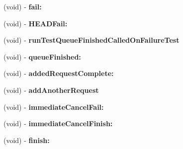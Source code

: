 \begin{DoxyCompactItemize}
\item 
\hypertarget{interface_a_s_i_network_queue_tests_07_08_a672f203e09f2d4f39fb2f1824cd85443}{
(void) -\/ {\bfseries fail\-:}}
\label{interface_a_s_i_network_queue_tests_07_08_a672f203e09f2d4f39fb2f1824cd85443}

\item 
\hypertarget{interface_a_s_i_network_queue_tests_07_08_abebd73c6087a317cf7d40a0694fa0554}{
(void) -\/ {\bfseries \-H\-E\-A\-D\-Fail\-:}}
\label{interface_a_s_i_network_queue_tests_07_08_abebd73c6087a317cf7d40a0694fa0554}

\item 
\hypertarget{interface_a_s_i_network_queue_tests_07_08_a863286b45c212a9aff1fd8c9415e8eb8}{
(void) -\/ {\bfseries run\-Test\-Queue\-Finished\-Called\-On\-Failure\-Test}}
\label{interface_a_s_i_network_queue_tests_07_08_a863286b45c212a9aff1fd8c9415e8eb8}

\item 
\hypertarget{interface_a_s_i_network_queue_tests_07_08_a7d969cf7beaae41da4ec7ee5d2f524d4}{
(void) -\/ {\bfseries queue\-Finished\-:}}
\label{interface_a_s_i_network_queue_tests_07_08_a7d969cf7beaae41da4ec7ee5d2f524d4}

\item 
\hypertarget{interface_a_s_i_network_queue_tests_07_08_ab8add5e0479640989a141e56dfcf046a}{
(void) -\/ {\bfseries added\-Request\-Complete\-:}}
\label{interface_a_s_i_network_queue_tests_07_08_ab8add5e0479640989a141e56dfcf046a}

\item 
\hypertarget{interface_a_s_i_network_queue_tests_07_08_a7f9925729daa7cce26bd2301d1b86c2b}{
(void) -\/ {\bfseries add\-Another\-Request}}
\label{interface_a_s_i_network_queue_tests_07_08_a7f9925729daa7cce26bd2301d1b86c2b}

\item 
\hypertarget{interface_a_s_i_network_queue_tests_07_08_ab7c057d1956cb3bda4f21d43260ee1a7}{
(void) -\/ {\bfseries immediate\-Cancel\-Fail\-:}}
\label{interface_a_s_i_network_queue_tests_07_08_ab7c057d1956cb3bda4f21d43260ee1a7}

\item 
\hypertarget{interface_a_s_i_network_queue_tests_07_08_a7d6d1e74ed81581f13c7fa469a78154d}{
(void) -\/ {\bfseries immediate\-Cancel\-Finish\-:}}
\label{interface_a_s_i_network_queue_tests_07_08_a7d6d1e74ed81581f13c7fa469a78154d}

\item 
\hypertarget{interface_a_s_i_network_queue_tests_07_08_a3749253f9e2a43e19ff634c691a289b2}{
(void) -\/ {\bfseries finish\-:}}
\label{interface_a_s_i_network_queue_tests_07_08_a3749253f9e2a43e19ff634c691a289b2}


\end{DoxyCompactItemize}

